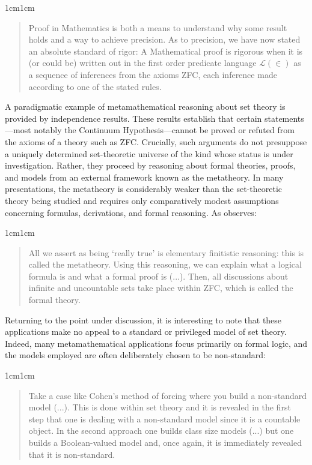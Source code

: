 \documentclass[11pt,a4paper]{book}
\theoremstyle{plain}
\begin{document}
\begin{adjustwidth}{1cm}{1cm}
\small
\begin{quote}
Proof in Mathematics is both a means to understand why some result holds and a way to achieve precision. As to precision, we have now stated an absolute standard of rigor: A Mathematical proof is rigorous when it is (or could be) written out in the first order predicate language $\mathcal{L}(\in)$ as a sequence of inferences from the axioms ZFC, each inference made according to one of the stated rules.
\end{quote}
\end{adjustwidth}

A paradigmatic example of metamathematical reasoning about set theory is provided by independence results. These results establish that certain statements—most notably the Continuum Hypothesis—cannot be proved or refuted from the axioms of a theory such as ZFC. Crucially, such arguments do not presuppose a uniquely determined set-theoretic universe of the kind whose status is under investigation. Rather, they proceed by reasoning about formal theories, proofs, and models from an external framework known as the metatheory. In many presentations, the metatheory is considerably weaker than the set-theoretic theory being studied and requires only comparatively modest assumptions concerning formulas, derivations, and formal reasoning. As \textcite[11]{Kunen2011} observes: 

\begin{adjustwidth}{1cm}{1cm}
\begin{quote}
  \small
All we assert as being ‘really true’ is elementary finitistic reasoning: this is called the metatheory. Using this reasoning, we can explain what a logical formula is and what a formal proof is (...). Then, all discussions about infinite and uncountable sets take place within ZFC, which is called the formal theory.
\end{quote}
\end{adjustwidth}

Returning to the point under discussion, it is interesting to note that these applications make no appeal to a standard or privileged model of set theory. Indeed, many metamathematical applications focus primarily on formal logic, and the models employed are often deliberately chosen to be non-standard:

\begin{adjustwidth}{1cm}{1cm}
\begin{quote}
\small
Take a case like Cohen's method of forcing where you build a non-standard model (...). This is done within set theory and it is revealed in the first step that one is dealing with a non-standard model since it is a countable object. In the second approach one builds class size models (...) but one builds a Boolean-valued model and, once again, it is immediately revealed that it is non-standard. \parencite[p. 16]{Koellner2022}
\end{quote}
\end{adjustwidth}
\end{document}
